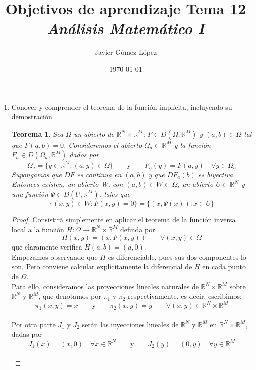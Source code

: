 \documentclass[a4paper, 12pt]{article}
\title{\textbf{Objetivos de aprendizaje Tema 12} \\ \textit{Análisis Matemático I}}
\author{Javier Gómez López}
\date{\today}
\newtheorem*{teorema*}{Teorema}
\begin{document}
\maketitle

\begin{enumerate}[label=\textbf{\arabic*}.]
	\item Conocer y comprender el teorema de la función implícita, incluyendo su demostración
	
	\begin{teorema*}
	Sea \(\Omega\) un abierto de \(\mathbb{R}^N \times \mathbb{R}^M\), \(F \in D(\Omega, \mathbb{R}^M)\) y \((a,b) \in \Omega\) tal que \(F (a,b) = 0\). Consideremos el abierto \(\Omega_a \subset \mathbb{R}^M\) y la función \(F_a \in D(\Omega_a, \mathbb{R}^M)\) dados por
	\[
		\Omega_a = \{ y \in \mathbb{R}^M : (a,y) \in \Omega\} \qquad \text{y} \qquad F_a(y) = F(a,y) \quad \forall y \in \Omega_a
	\]
	Supongamos que \(DF\) es continua en \((a,b)\) y que \(DF_a (b)\) es biyectiva. Entonces existen, un abierto W, con \((a,b) \in W \subset \Omega\), un abierto \( U \subset \mathbb{R}^N\) y una función \(\Psi \in D(U, \mathbb{R}^M)\), tales que
	\begin{equation}\label{teorema}
		\{ (x,y) \in W : F(x,y) = 0\} = \{ (x, \Psi (x)) : x \in U\}
	\end{equation}
	\end{teorema*}
	
\bigskip

\begin{proof}
Consistirá simplemente en aplicar el teorema de la función inversa local a la función \(H: \Omega \to \mathbb{R}^N \times \mathbb{R}^M\) definda por
\[
	H(x,y) = (x, F(x,y)) \qquad \forall (x,y) \in \Omega
\]
que claramente verifica \(H(a,b) = (a,0)\). \\

Empezamos observando que \(H\) es diferenciable, pues sus dos componentes lo son. Pero conviene calcular explícitamente la diferencial de \(H\) en cada punto de \(\Omega\). \\

Para ello, consideramos las proyecciones lineales naturales de \(\mathbb{R}^N \times \mathbb{R}^M\) sobre \(\mathbb{R}^N\) y \(\mathbb{R}^M\), que denotamos por \(\pi_1\) y \(\pi_2\) respectivamente, es decir, escribimos:
\[
	\pi_1 (x,y) = x \qquad \text{y} \qquad \pi_2 (x,y) = y \qquad \forall (x,y) \in \mathbb{R}^N \times \mathbb{R}^M
\] \\

Por otra parte \(J_1\) y \(J_2\) serán las inyecciones lineales de \(\mathbb{R}^N\) y \(\mathbb{R}^M\) en \(\mathbb{R}^N \times \mathbb{R}^M\), dadas por
\[
	J_1(x) = (x,0) \quad \forall x \in \mathbb{R}^N \qquad \text{y} \qquad J_2(y) = (0,y) \quad \forall y \in \mathbb{R}^M
\] \\


\end{proof}
\end{enumerate}
\end{document}

